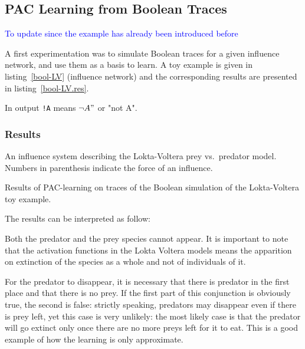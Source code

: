 \documentclass{llncs}
\newcommand{\francois}[1]{\textcolor{blue}{#1}}
\begin{document}
\subsection{PAC Learning from Boolean Traces}

\francois{To update since the example has already been introduced before}

A first experimentation was to simulate Boolean traces for a given influence network, and use them as a basis to learn. 
A toy example is given in listing~\ref{bool-LV} (influence network) and the corresponding results are presented in listing~\ref{bool-LV.res}.

In output \texttt{!A} means $\neg A"$ or "not A".

\subsubsection{Results}

\begin{listfig}[htp]
	
	\vspace{-1em}
	\caption{An influence system describing the Lokta-Voltera prey vs.\ predator model. Numbers in parenthesis indicate the force of an influence. \label{bool-LV}}
\end{listfig}
\begin{listfig}[htp]
	
	\vspace{-1em}
	\caption{Results of PAC-learning on traces of the Boolean simulation of the Lokta-Voltera toy example.\label{bool-LV.res}}
\end{listfig}

The results can be interpreted as follow:

Both the predator and the prey species cannot appear. It is important to note that the activation functions in the Lokta Voltera models means the apparition on extinction of the species as a whole and not of individuals of it.

For the predator to disappear, it is necessary that there is predator in the first place and that there is no prey. If the first part of this conjunction is obviously true, the second is false: strictly speaking, predators may disappear even if there is prey left, yet this case is very unlikely: the most likely case is that the predator will go extinct only once there are no more preys left for it to eat. This is a good example of how the learning is only approximate.
\end{document}
